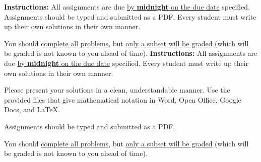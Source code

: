 

\extrawidth{0.5in} \extrafootheight{-0in} \pagestyle{headandfoot}
\headrule {} \footrule {}

\ifprintanswers
\noindent \textbf{Instructions:} All assignments are due \underline{by \textbf{midnight} on the due date} specified.  Assignments should be typed and submitted as a PDF.  Every student must write up their own solutions in their own manner.

\medskip
\noindent You should \underline{complete all problems}, but \underline{only a subset will be graded} (which will be graded is not known to you ahead of time). 
\else
\noindent \textbf{Instructions:} All assignments are due \underline{by \textbf{midnight} on the due date} specified.  Every student must write up their own solutions in their own manner.

\noindent Please present your solutions in a clean, understandable
manner.  Use the provided files that give mathematical notation in Word, Open Office, Google Docs, and \LaTeX. 

\noindent Assignments should be typed and submitted as a PDF.   

\noindent You should \underline{complete all problems}, but \underline{only a subset will be graded} (which will be graded is not known to you ahead of time). 
\fi

